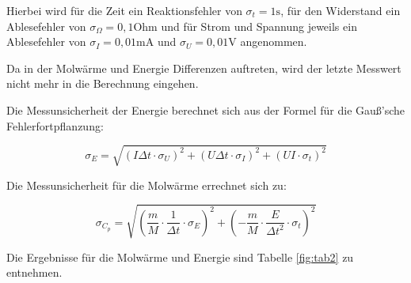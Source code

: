\noindent Hierbei wird für die Zeit ein Reaktionsfehler von \(\sigma_t=1\text{s}\), für den Widerstand ein Ablesefehler von \(\sigma_\Omega=0,1\text{Ohm}\) und für Strom und Spannung jeweils ein Ablesefehler von \(\sigma_I=0,01\text{mA}\) und \(\sigma_U=0,01\text{V}\) angenommen.

\noindent Da in der Molwärme und Energie Differenzen auftreten, wird der letzte Messwert nicht mehr in die Berechnung eingehen.

\noindent Die Messunsicherheit der Energie berechnet sich aus der Formel für die Gauß'sche Fehlerfortpflanzung:

\begin{equation}
\sigma_E=\sqrt{(I\Delta t\cdot\sigma_U)^2 + (U\Delta t\cdot\sigma_I)^2 + (UI\cdot\sigma_t)^2}
\end{equation}

\noindent Die Messunsicherheit für die Molwärme errechnet sich zu:

\begin{equation}
\sigma_{C_p}=\sqrt{\left(\frac mM\cdot\frac{1}{\Delta t}\cdot\sigma_E\right)^2+\left(-\frac mM\cdot\frac{E}{\Delta t^2}\cdot\sigma_t\right)^2 }
\end{equation}

\noindent Die Ergebnisse für die Molwärme und Energie sind Tabelle \ref{fig:tab2} zu entnehmen.

